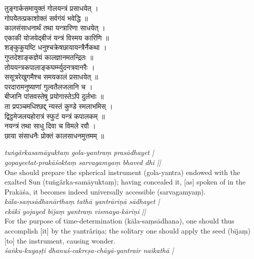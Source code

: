 \documentclass[11pt,a4paper]{article}
\newcommand{\dev}[1]{{\devanagarifont #1}}
\newcommand{\bilingualpair}[2]{%
  \noindent%
  \begin{minipage}[t]{0.48\textwidth}
    #1%
  \end{minipage}%
  \hfill%
  \begin{minipage}[t]{0.48\textwidth}
    #2%
  \end{minipage}%
  \par\vspace{0.5em}%
}
\newenvironment{sanskritcol}{\devanagarifont\small}{}
\newenvironment{englishcol}{\iastfont\small}{}
\begin{document}
\vspace{0.3cm}
\bilingualpair{%
\begin{sanskritcol}
\dev{तुङ्गार्कसमायुक्तं गोलयन्त्रं प्रसाधयेत् ।}\\[0.3em]
\dev{गोपयेेतत्प्रकाशोक्तं सर्वगंयं भवेद्धि ॥}\\[0.5em]
\dev{कालसंसाधनार्थं तथा यन्त्रारिणा साधयेत् ।}\\[0.3em]
\dev{एकाकी योजयेद्‌बीजं यन्त्रं विस्मय कारिणि ॥}\\[0.5em]
\dev{शङ्कुकुयष्टि धनुश्चक्रेषछायायन्त्रैर्नैकथा ।}\\[0.3em]
\dev{गुप्तदेशाङ्कज्ञेयं कालज्ञानमतन्द्रितः ॥}\\[0.5em]
\dev{तोययन्त्रकपालाङ्कघर्म्म्युदनत्रवानरैः ।}\\[0.3em]
\dev{ससूत्ररेखुगमैश्च समयकालं प्रसाधयेत् ॥}\\[0.5em]
\dev{परदारामनुष्याणां गुल्वतैलजलानि च ।}\\[0.3em]
\dev{बीजानि पांसवस्तेषु प्रयोगास्तेऽपि दुर्लभाः ॥}\\[0.5em]
\dev{ता प्रपञ्चमधिश्छद्द् न्यस्तं कुण्डे स्मलाभमिस् ।}\\[0.3em]
\dev{द्विट्ठमेजलयहोरात्रं स्फुटं यन्त्रं कपालकम् ॥}\\[0.5em]
\dev{नयन्त्रं तथा साधु दिवा च विमले रवौ ।}\\[0.3em]
\dev{छाया संसाधनैः प्रोक्तं कालसाधनमुत्तमम् ॥}
\end{sanskritcol}%
}{%
\begin{englishcol}
\textit{tuṅgârkasamāyuktaṃ gola-yantraṃ prasādhayet |}\\[0.3em]
\textit{gopayeetat-prakāśoktaṃ sarvagamyaṃ bhaved dhi ||}\\[0.3em]
One should prepare the spherical instrument (gola-yantra) endowed with the exalted Sun (tuṅgârka-samāyuktaṃ); having concealed it, [as] spoken of in the Prakāśa, it becomes indeed universally accessible (sarvagamyaṃ).\\[0.5em]
\textit{kāla-saṃsādhanārthaṃ tathā yantrāriṇā sādhayet |}\\[0.3em]
\textit{ekākī yojayed bījaṃ yantraṃ vismaya-kāriṇi ||}\\[0.3em]
For the purpose of time-determination (kāla-saṃsādhana), one should thus accomplish [it] by the yantrâriṇa; the solitary one should apply the seed (bījaṃ) [to] the instrument, causing wonder.\\[0.5em]
\textit{\'saṅku-kuyaṣṭi dhanuś-cakreṣa-chāyā-yantrair naikathā |}\\[0.3em]

\end{englishcol}}
\end{document}
